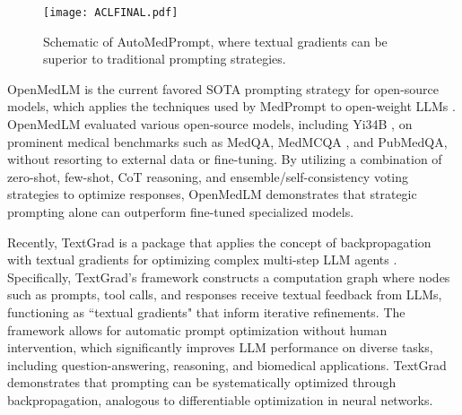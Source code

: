 \begin{figure*}[t] %
    \centering
    \texttt{[image: ACLFINAL.pdf]} %
    \caption{Schematic of AutoMedPrompt, where textual gradients can be superior to traditional prompting strategies.}
    \label{fig:example}
\end{figure*}
OpenMedLM is the current favored SOTA prompting strategy for open-source models, which applies the techniques used by MedPrompt to open-weight LLMs \cite{maharjan2024openmedlm}. OpenMedLM evaluated various open-source models, including Yi34B \cite{01ai2024yi}, on prominent medical benchmarks such as MedQA, MedMCQA \cite{pal2022medmcqa}, and PubMedQA, without resorting to external data or fine-tuning. By utilizing a combination of zero-shot, few-shot, CoT reasoning, and ensemble/self-consistency voting strategies to optimize responses, OpenMedLM demonstrates that strategic prompting alone can outperform fine-tuned specialized models.

Recently, TextGrad is a package that applies the concept of backpropagation with textual gradients for optimizing complex multi-step LLM agents \cite{yuksekgonul2024textgrad}. Specifically, TextGrad's framework constructs a computation graph where nodes such as prompts, tool calls, and responses receive textual feedback from LLMs, functioning as ``textual gradients" that inform iterative refinements. The framework allows for automatic prompt optimization without human intervention, which significantly improves LLM performance on diverse tasks, including question-answering, reasoning, and biomedical applications. TextGrad demonstrates that prompting can be systematically optimized through backpropagation, analogous to differentiable optimization in neural networks.